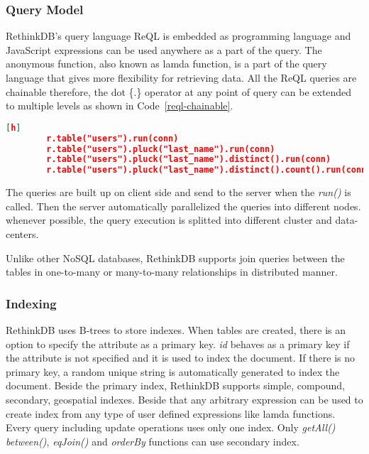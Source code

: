 \subsubsection{Query Model}
RethinkDB's query language ReQL is embedded as programming language and JavaScript expressions can be used anywhere as a part of the query. The anonymous function, also known as lamda function, is a part of the query language that gives more flexibility for retrieving data. All the ReQL queries are chainable therefore, the dot \{.\} operator at any point of query can be extended to multiple levels as shown in Code~\ref{reql-chainable}.
	\begin{lstlisting}[language=JSON,caption=Chainable Query in ReQL, label=reql-chainable, xleftmargin=-40pt, 	basicstyle=\ttfamily\footnotesize][h]
		r.table("users").run(conn)
		r.table("users").pluck("last_name").run(conn)
		r.table("users").pluck("last_name").distinct().run(conn)
		r.table("users").pluck("last_name").distinct().count().run(conn)
	\end{lstlisting} 
The queries are built up on client side and send to the server when the \textit{run()} is called. Then the server automatically parallelized the queries into different nodes. whenever possible, the query execution is splitted into different cluster and data-centers.
\par
Unlike other NoSQL databases, RethinkDB supports join queries between the tables in one-to-many or many-to-many relationships in distributed manner. 
\subsubsection{Indexing}
	RethinkDB uses B-trees to store indexes. When tables are created, there is an option to specify the attribute as a primary key. \textit{id} behaves as a primary key if the attribute is not specified and it is used to index the document. If there is no  primary key, a random unique string is automatically generated to index the document. Beside the primary index, RethinkDB supports simple, compound, secondary, geospatial indexes. Beside that any arbitrary expression can be used to create index from any type of user defined expressions like lamda functions. Every query including update operations uses only one index.
	 Only \textit{getAll()} \textit{between()}, \textit{eqJoin()} and \textit{orderBy} functions can use secondary index.